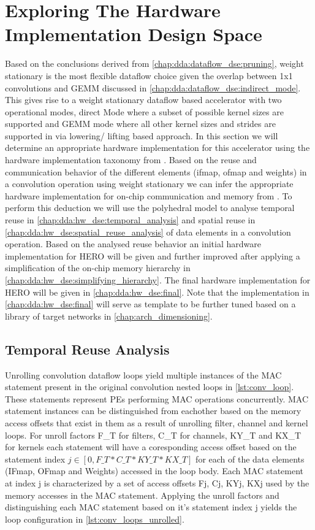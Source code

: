 \section{Exploring The Hardware Implementation Design Space}
\label{chap:dda:hw_dse}

Based on the conclusions derived from \autoref{chap:dda:dataflow_dse:pruning},
weight stationary is the most flexible dataflow choice given the overlap between
1x1 convolutions and GEMM discussed in
\autoref{chap:dda:dataflow_dse:indirect_mode}. This gives rise to a weight
stationary dataflow based accelerator
with two
operational modes, direct Mode where a subset of possible kernel sizes are
supported and GEMM mode where all other kernel sizes and strides are supported
in via lowering/ lifting based approach. In this section we will determine an
appropriate hardware implementation for this accelerator using the hardware
implementation taxonomy from \cite{maestro}. Based on the reuse and
communication behavior of the different elements (ifmap, ofmap and weights) in a
convolution operation using weight stationary we can infer the appropriate
hardware implementation for on-chip communication and memory from
\cite{maestro}. To perform this deduction we will use the polyhedral model to
analyse temporal reuse in \autoref{chap:dda:hw_dse:temporal_analysis} and
spatial reuse in \autoref{chap:dda:hw_dse:spatial_reuse_analysis} of data
elements in a convolution operation. Based on the
analysed reuse behavior an initial hardware implementation for HERO will be
given and further improved after applying a simplification of the on-chip memory
hierarchy in \autoref{chap:dda:hw_dse:simplifying_hierarchy}. The final hardware
implementation for HERO will be given in \autoref{chap:dda:hw_dse:final}. Note
that the implementation in \autoref{chap:dda:hw_dse:final} will serve as
template to be further tuned based on a library of target networks in
\autoref{chap:arch_dimensioning}.  

\subsection{Temporal Reuse Analysis}
\label{chap:dda:hw_dse:temporal_analysis}

Unrolling convolution dataflow loops yield multiple instances of the \ac{MAC}
statement present in the original convolution nested loops in
\autoref{lst:conv_loop}. These statements represent \ac{PE}s performing MAC
operations concurrently. 
\ac{MAC} statement instances can be distinguished from eachother based on the memory access offsets that
exist in them as a result of unrolling filter, channel and kernel loops. For
unroll factors F\_T for filters, C\_T for channels, KY\_T and KX\_T for kernels
each statement will have a coresponding access offset based on the statement
index $j \in [0, F\_T*C\_T*KY\_T*KX\_T]$ for each of the data elements
(IFmap, OFmap and Weights) accessed in the loop body. Each \ac{MAC} statement
at index j is characterized by a set of access offsets {Fj, Cj, KYj,
KXj} used by the memory accesses in the \ac{MAC} statement. Applying the unroll
factors and distinguishing each \ac{MAC} statement based on it's statement index
j yields the loop configuration in \autoref{lst:conv_loops_unrolled}. 

